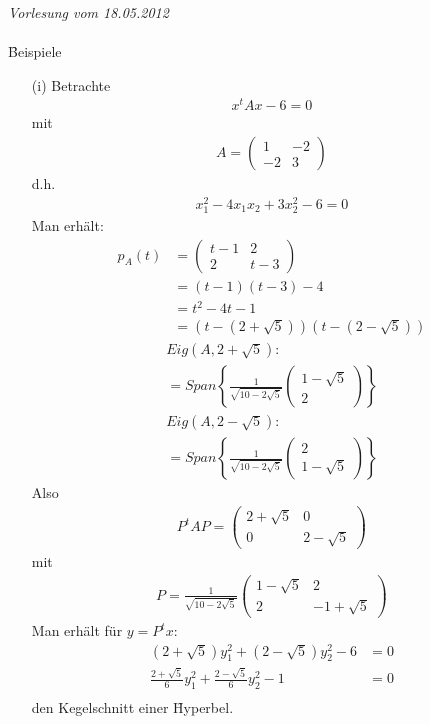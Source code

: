 \newpage
\noindent \textit{Vorlesung vom 18.05.2012} \\\\
\f{Beispiele} 
\begin{itemize}
\item[(i)] Betrachte
\begin{align}
x^t Ax - 6 = 0
\end{align}
mit 
\begin{align}
A = \begin{pmatrix} 1 & -2 \\ -2 & 3\end{pmatrix}
\end{align}
d.h.
\begin{align}
x_1^2 - 4x_1 x_2 + 3x_2^2 - 6 = 0
\end{align}
Man erhält:
\begin{align}
p_A(t) &= \begin{pmatrix} t-1 & 2 \\ 2 & t-3 \end{pmatrix} \\
 &= (t-1)(t-3)-4 \\
 &= t^2 - 4t -1 \\
 &= (t - (2+ \sqrt{5})) (t-(2- \sqrt{5})) 
\end{align}
\begin{align}
Eig(A, 2 + \sqrt{5}): \\
= Span\left\{ \frac{1}{\sqrt{10-2\sqrt{5}}} \begin{pmatrix} 1 - \sqrt{5} \\ 2 \end{pmatrix} \right\}
\end{align}
\begin{align}
Eig(A, 2 - \sqrt{5}): \\
= Span\left\{ \frac{1}{\sqrt{10-2\sqrt{5}}} \begin{pmatrix} 2 \\ 1 - \sqrt{5} \end{pmatrix} \right\}
\end{align}
Also
\begin{align}
 P^t A P = \begin{pmatrix} 2 + \sqrt{5} & 0 \\ 0 & 2-\sqrt{5}\end{pmatrix}
\end{align}
mit
\begin{align}
P = \frac{1}{\sqrt{10-2\sqrt{5}}} \begin{pmatrix} 1- \sqrt{5} & 2 \\ 2 & -1+ \sqrt{5} \end{pmatrix}
\end{align}
Man erhält für $y = P^t x$:
\begin{align}
(2 + \sqrt{5})y_1^2 + (2 - \sqrt{5})y_2^2 - 6 &= 0 \\
\frac{2 + \sqrt{5}}{6} y_1^2 + \frac{2 - \sqrt{5}}{6} y_2^2 - 1 &= 0 \\
\end{align}
den Kegelschnitt einer \f{Hyperbel}.


\end{itemize}
